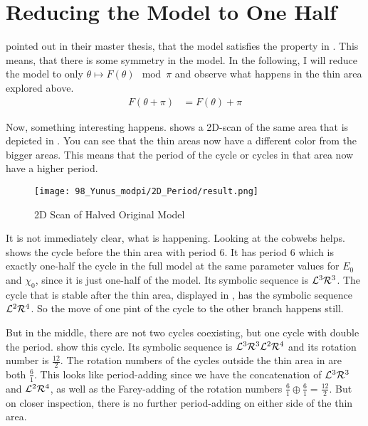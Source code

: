 \section{Reducing the Model to One Half}

 pointed out in their master thesis, that the model satisfies the property in .
This means, that there is some symmetry in the model.
In the following, I will reduce the model to only $\theta \mapsto F(\theta) \mod \pi$ and observe what happens in the thin area explored above.
\begin{align}
    F(\theta + \pi) & = F(\theta) + \pi \label{equ:yunus.property.symmetry}
\end{align}

Now, something interesting happens.
 shows a 2D-scan of the same area that is depicted in .
You can see that the thin areas now have a different color from the bigger areas.
This means that the period of the cycle or cycles in that area now have a higher period.

\begin{figure}
    \centering
    \texttt{[image: 98\_Yunus\_modpi/2D\_Period/result.png]}
    \caption{2D Scan of Halved Original Model}
    \label{fig:yunus.pi.2d.full}
\end{figure}

It is not immediately clear, what is happening.
Looking at the cobwebs helps.
 shows the cycle before the thin area with period 6.
It has period 6 which is exactly one-half the cycle in the full model at the same parameter values for $E_0$ and $\chi_0$, since it is just one-half of the model.
Its symbolic sequence is $\mathcal{L}^3\mathcal{R}^3$.
The cycle that is stable after the thin area, displayed in , has the symbolic sequence $\mathcal{L}^2\mathcal{R}^4$.
So the move of one pint of the cycle to the other branch happens still.

But in the middle, there are not two cycles coexisting, but one cycle with double the period.
 show this cycle.
Its symbolic sequence is $\mathcal{L}^3\mathcal{R}^3\mathcal{L}^2\mathcal{R}^4$ and its rotation number is $\frac{12}{2}$.
The rotation numbers of the cycles outside the thin area in  are both $\frac{6}{1}$.
This looks like period-adding since we have the concatenation of $\mathcal{L}^3\mathcal{R}^3$ and $\mathcal{L}^2\mathcal{R}^4$, as well as the Farey-adding of the rotation numbers $\frac{6}{1} \oplus \frac{6}{1} = \frac{12}{2}$.
But on closer inspection, there is no further period-adding on either side of the thin area.

